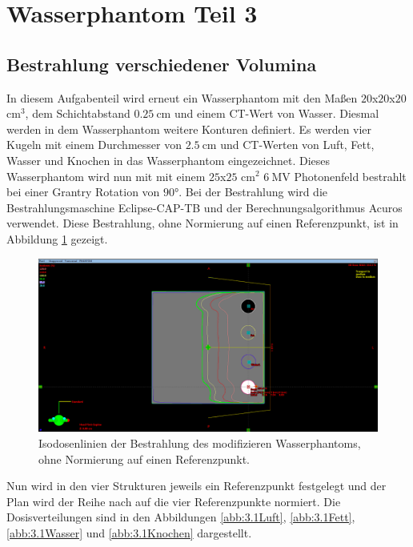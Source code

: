 \section{Wasserphantom Teil 3}

\subsection{Bestrahlung verschiedener Volumina}

In diesem Aufgabenteil wird erneut ein Wasserphantom mit den Maßen
$20$x$20$x$20$ $\si{\centi\meter\tothe{3}}$, dem Schichtabstand
$\SI{0.25}{\centi\meter}$ und einem CT-Wert von Wasser.
Diesmal werden in dem Wasserphantom weitere Konturen definiert.
Es werden vier Kugeln mit einem Durchmesser von $\SI{2.5}{\centi\meter}$
und CT-Werten von Luft, Fett, Wasser und Knochen in das Wasserphantom
eingezeichnet. Dieses Wasserphantom wird nun mit mit einem
$25$x$25$ $\si{\centi\meter\squared}$ $\SI{6}{\mega\volt}$ Photonenfeld
bestrahlt bei einer Grantry Rotation von $90°$. Bei der Bestrahlung wird
die Bestrahlungsmaschine Eclipse-CAP-TB und der Berechnungsalgorithmus
Acuros verwendet. Diese Bestrahlung, ohne Normierung auf einen
Referenzpunkt, ist in Abbildung \ref{abb:3.1unnormiert} gezeigt.

\begin{figure}[H]
  \centering
  \includegraphics[width=\textwidth]{../../Wasserphantom Bilder/Aufgabe3.1_OhneReferenz.png}
  \caption{Isodosenlinien der Bestrahlung des modifizieren Wasserphantoms, ohne Normierung auf einen Referenzpunkt.}
  \label{abb:3.1unnormiert}
\end{figure}

Nun wird in den vier Strukturen jeweils ein Referenzpunkt festgelegt und der
Plan wird der Reihe nach auf die vier Referenzpunkte normiert. Die
Dosisverteilungen sind in den Abbildungen \ref{abb:3.1Luft},
\ref{abb:3.1Fett}, \ref{abb:3.1Wasser} und \ref{abb:3.1Knochen} dargestellt.

